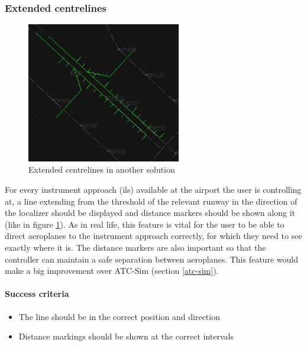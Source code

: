 \documentclass{article}
\begin{document}
\subsubsection{Extended centrelines}
\begin{figure}[H]
\centering
\includegraphics[width=0.6\textwidth]{context/centrelines.jpg}
\caption{\label{fig:centrelines}Extended centrelines in another solution}
\end{figure}
For every instrument approach (\acrshort{ils}) available at the airport the user is controlling at, a line extending from the threshold of the relevant runway in the direction of the localizer should be displayed and distance markers should be shown along it (like in figure \ref{fig:centrelines}).
As in real life, this feature is vital for the user to be able to direct aeroplanes to the instrument approach correctly, for which they need to see exactly where it is.
The distance markers are also important so that the controller can maintain a safe separation between aeroplanes.
This feature would make a big improvement over ATC-Sim (section \ref{atc-sim}).

\paragraph{Success criteria}
\begin{itemize}
    \item The line should be in the correct position and direction
    \item Distance markings should be shown at the correct intervals
\end{itemize}


\clearpage
\end{document}
